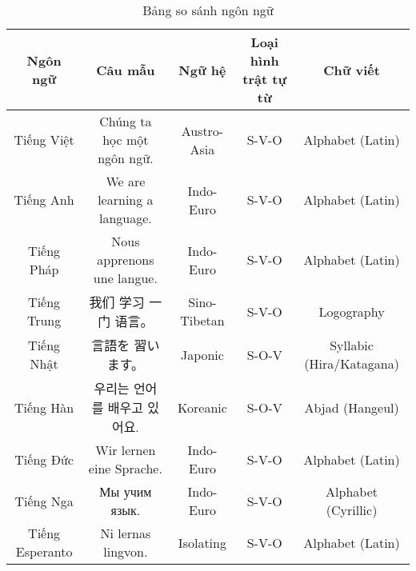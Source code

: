 \documentclass{article}
\begin{document}
\begin{table}[htbp]
    \centering
    \caption{Bảng so sánh ngôn ngữ}
    \begin{tabular}{|c|c|c|c|c|}
        \hline
        \textbf{Ngôn ngữ} & \textbf{Câu mẫu} & \textbf{Ngữ hệ} & \textbf{Loại hình trật tự từ} & \textbf{Chữ viết} \\
        \hline
        Tiếng Việt & Chúng ta học một ngôn ngữ. & Austro-Asia & S-V-O & Alphabet (Latin) \\
        \hline
        Tiếng Anh & We are learning a language. & Indo-Euro & S-V-O & Alphabet (Latin) \\
        \hline
        Tiếng Pháp & Nous apprenons une langue. & Indo-Euro & S-V-O & Alphabet (Latin) \\
        \hline
        Tiếng Trung & 我们 学习 一门 语言。 & Sino-Tibetan & S-V-O & Logography \\
        \hline
        Tiếng Nhật & 言語を 習います。 & Japonic & S-O-V & Syllabic (Hira/Katagana) \\
        \hline
        Tiếng Hàn & 우리는 언어를 배우고 있어요. & Koreanic & S-O-V & Abjad (Hangeul) \\
        \hline
        Tiếng Đức & Wir lernen eine Sprache. & Indo-Euro & S-V-O & Alphabet (Latin) \\
        \hline
        Tiếng Nga & Мы учим язык. & Indo-Euro & S-V-O & Alphabet (Cyrillic) \\
        \hline
        Tiếng Esperanto & Ni lernas lingvon. & Isolating & S-V-O & Alphabet (Latin) \\
        \hline
    \end{tabular}
\end{table}
\end{document}
